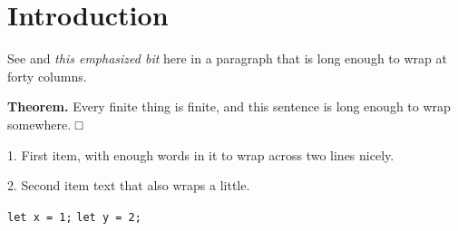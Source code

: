 \flmHeading[toc=true]
\section{Introduction}{\flmLabels{\label{ref1}}}

See  and \emph{this emphasized bit} here in a paragraph that
is long enough to wrap at forty columns.

\textbf{Theorem.} Every finite thing is finite, and this sentence is long
enough to wrap somewhere. □

1. First item, with enough words in it to wrap across two lines nicely.

2. Second item text that also wraps a little.

\texttt{let x = 1;} \texttt{let y = 2;}
\RequirePackage{newunicodechar}
\RequirePackage{amssymb}
\RequirePackage{zref-clever}
%
%
